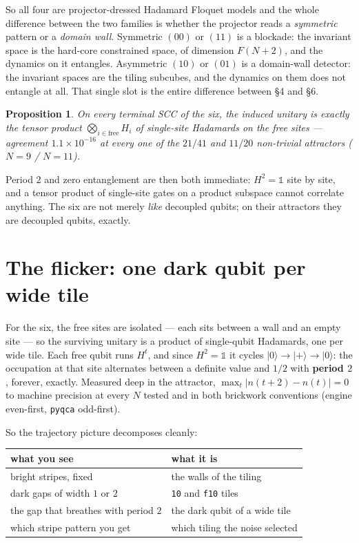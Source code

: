\documentclass[11pt]{article}
\newcommand{\rt}[1]{\texttt{#1}}
\newcommand{\fn}[1]{\texttt{#1}}
\theoremstyle{plain}
\newtheorem{proposition}{Proposition}
\begin{document}
\noindent So all four are projector-dressed Hadamard Floquet models and the whole
difference between the two families is whether the projector reads a
\emph{symmetric} pattern or a \emph{domain wall}. Symmetric $(00)$ or $(11)$ is a
blockade: the invariant space is the hard-core constrained space, of dimension
$F(N+2)$, and the dynamics on it entangles. Asymmetric $(10)$ or $(01)$ is a
domain-wall detector: the invariant spaces are the tiling subcubes, and the
dynamics on them does not entangle at all. That single slot is the entire
difference between \S4 and \S6.

\begin{proposition}
On every terminal SCC of the six, the induced unitary is exactly the tensor
product $\bigotimes_{i\in\mathrm{free}}H_i$ of single-site Hadamards on the free
sites --- agreement $1.1\times10^{-16}$ at every one of the $21/41$ and $11/20$
non-trivial attractors ($N=9$ / $N=11$).
\end{proposition}

\noindent Period $2$ and zero entanglement are then both immediate: $H^2=\mathbb{1}$
site by site, and a tensor product of single-site gates on a product subspace
cannot correlate anything. The six are not merely \emph{like} decoupled qubits;
on their attractors they are decoupled qubits, exactly.

\section{The flicker: one dark qubit per wide tile}

For the six, the free sites are isolated --- each sits between a wall and an
empty site --- so the surviving unitary is a product of single-qubit Hadamards,
one per wide tile. Each free qubit runs $H^t$, and since $H^2=\mathbb{1}$ it
cycles $\lvert0\rangle\to\lvert+\rangle\to\lvert0\rangle$: the occupation at that
site alternates between a definite value and $1/2$ with \textbf{period $2$},
forever, exactly. Measured deep in the attractor,
$\max_t\lvert n(t+2)-n(t)\rvert = 0$ to machine precision at every $N$ tested and
in both brickwork conventions (engine even-first, \fn{pyqca} odd-first).

So the trajectory picture decomposes cleanly:

\begin{center}
\begin{tabular}{ll}
\toprule
what you see & what it is \\
\midrule
bright stripes, fixed & the walls of the tiling \\
dark gaps of width $1$ or $2$ & \rt{10} and \rt{f10} tiles \\
the gap that breathes with period $2$ & the dark qubit of a wide tile \\
which stripe pattern you get & which tiling the noise selected \\
\bottomrule
\end{tabular}
\end{center}
\end{document}
